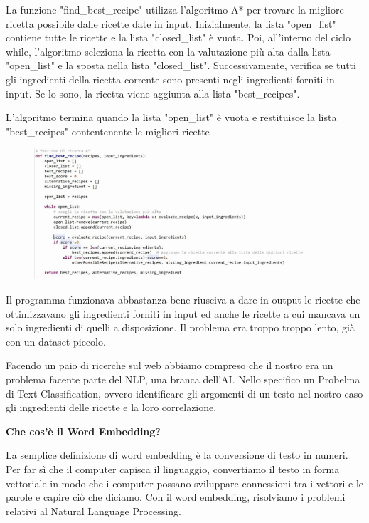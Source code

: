 \documentclass[12pt]{report}
\begin{document}
La funzione "find\_best\_recipe" utilizza l'algoritmo A* per trovare la migliore ricetta possibile dalle ricette date in input. Inizialmente, la lista "open\_list" contiene tutte le ricette e la lista "closed\_list" è vuota. Poi, all'interno del ciclo while, l'algoritmo seleziona la ricetta con la valutazione più alta dalla lista "open\_list" e la sposta nella lista "closed\_list". Successivamente, verifica se tutti gli ingredienti della ricetta corrente sono presenti negli ingredienti forniti in input. Se lo sono, la ricetta viene aggiunta alla lista "best\_recipes".

L'algoritmo termina quando la lista "open\_list" è vuota e restituisce la lista "best\_recipes" contentenente le migliori ricette
\begin{figure}[H]
        \centering
        {\includegraphics[width=0.9\textwidth]{img/img11.jpg}}
\end{figure}

Il programma funzionava abbastanza bene riusciva a dare in output le ricette che ottimizzavano gli ingredienti forniti in input ed anche le ricette a cui mancava un solo ingredienti di quelli a disposizione. Il problema era troppo troppo lento, già con un dataset piccolo.

Facendo un paio di ricerche sul web abbiamo compreso che il nostro era un problema facente parte del NLP, una branca dell’AI.
Nello specifico un Probelma di Text Classification, ovvero identificare gli argomenti di un testo nel nostro caso gli ingredienti delle ricette e la loro correlazione.

\textbf{Che cos’è il Word Embedding?}

La semplice definizione di word embedding è la conversione di testo in numeri. Per far sì che il computer capisca il linguaggio, convertiamo il testo in forma vettoriale in modo che i computer possano sviluppare connessioni tra i vettori e le parole e capire ciò che diciamo. Con il word embedding, risolviamo i problemi relativi al Natural Language Processing.
\end{document}
